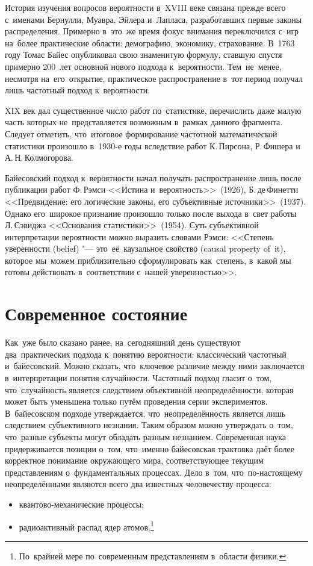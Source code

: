 \documentclass[]{scrartcl}
\begin{document}
История изучения вопросов вероятности в~XVIII веке связана прежде всего с~именами Бернулли, Муавра, Эйлера и~Лапласа, разработавших первые законы распределения. Примерно в~это~же время фокус внимания переключился с~игр на~более практические области: демографию, экономику, страхование. В~1763 году Томас Байес опубликовал свою знаменитую формулу, ставшую спустя примерно 200~лет основной нового подхода к~вероятности. Тем~не~менее, несмотря на~его~открытие, практическое распространение в~тот период получал лишь частотный подход к~вероятности.

XIX век дал существенное число работ по~статистике, перечислить даже малую часть которых не~представляется возможным в~рамках данного фрагмента. Следует отметить, что~итоговое формирование частотной математической статистики произошло в~1930-е годы вследствие работ К.\,Пирсона, Р.\,Фишера и А.\,Н.\,Колмогорова. 

Байесовский подход к~вероятности начал получать распространение лишь после публикации работ Ф.\,Рэмси <<Истина и~вероятность>>~(1926), Б.\,де\,Финетти <<Предвидение: его логические законы, его субъективные источники>>~(1937). Однако его~широкое признание произошло только после выхода в~свет работы Л.\,Сэвиджа <<Основания статистики>>~(1954). Суть субъективной интерпретации вероятности можно выразить словами Рэмси: <<Степень уверенности (belief) "--- это~её~каузальное свойство (causal property of~it), которое мы~можем приблизительно сформулировать как~степень, в~какой мы готовы действовать в~соответствии с~нашей уверенностью>>.


\section{Современное состояние}
Как~уже было сказано ранее, на~сегодняшний день существуют два~практических подхода к~понятию вероятности: классический частотный и~байесовский. Можно сказать, что~ключевое различие между ними заключается в~интерпретации понятия случайности. Частотный подход гласит о~том, что~случайность является следствием объективной неопределённости, которая может быть уменьшена только путём проведения серии экспериментов. В~байесовском подходе утверждается, что~неопределённость является лишь следствием субъективного незнания. Таким образом можно утверждать о~том, что~разные субъекты могут обладать разным незнанием. Современная наука придерживается позиции о~том, что~именно байесовская трактовка даёт более корректное понимание окружающего мира, соответствующее текущим представлениям о~фундаментальных процессах. Дело в~том, что~по-настоящему неопределёнными являются всего два известных человечеству процесса:
	\begin{itemize}
		\item квантово-механические процессы;
		\item радиоактивный распад ядер атомов.\footnote{По~крайней мере по~современным представлениям в~области физики.}
	\end{itemize}
\end{document}
